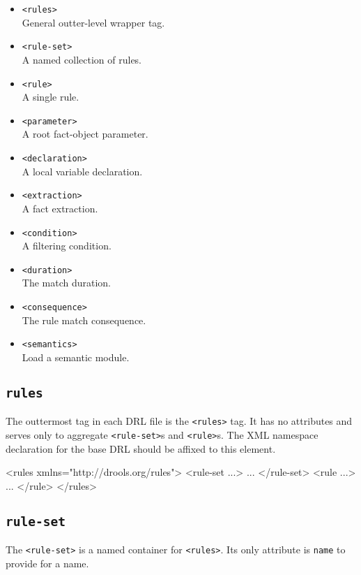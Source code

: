 \begin{itemize}
	\item \verb|<rules>|\\
		General outter-level wrapper tag.
	\item \verb|<rule-set>|\\
		A named collection of rules.
	\item \verb|<rule>|\\
		A single rule.
	\item \verb|<parameter>|\\
		A root fact-object parameter.
	\item \verb|<declaration>|\\
		A local variable declaration.
	\item \verb|<extraction>|\\
		A fact extraction.
	\item \verb|<condition>|\\
		A filtering condition.
	\item \verb|<duration>|\\
		The match duration.
	\item \verb|<consequence>|\\
		The rule match consequence.
	\item \verb|<semantics>|\\
		Load a semantic module.
\end{itemize}

\subsection{\texttt{rules}}

The outtermost tag in each DRL file is the \verb|<rules>| tag.  It has
no attributes and serves only to aggregate \verb|<rule-set>|s and
\verb|<rule>|s. The XML namespace declaration for the base DRL should
be affixed to this element.

\begin{codelisting}
<rules xmlns="http://drools.org/rules">
\textcolor{light}{  <rule-set ...>
    ...
  </rule-set>
  <rule ...>
    ...
  </rule>}
</rules>
\end{codelisting}

\subsection{\texttt{rule-set}}

The \verb|<rule-set>| is a named container for \verb|<rules>|.  Its
only attribute is \verb|name| to provide for a name.  

